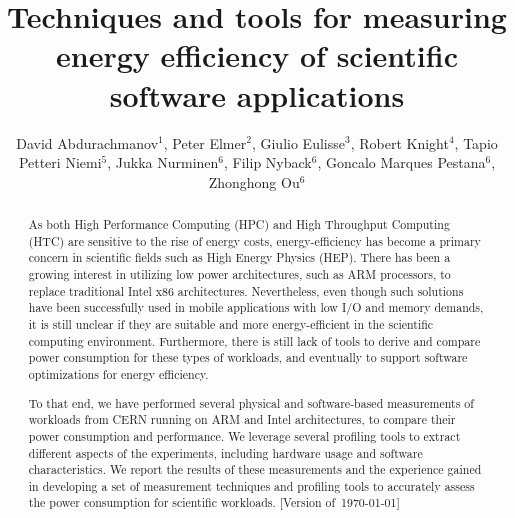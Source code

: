 \documentclass[a4paper]{jpconf}
\begin{document}

\title{Techniques and tools for measuring energy efficiency of scientific software applications}

\author{David Abdurachmanov$^1$, Peter Elmer$^2$, Giulio Eulisse$^3$, Robert Knight$^4$, Tapio Petteri Niemi$^5$, Jukka Nurminen$^6$, Filip Nyback$^6$, Goncalo Marques Pestana$^6$, Zhonghong Ou$^6$}

\address{$^1$ Digital Science and Computing Center, Faculty of Mathematics and Informatics, Vilnius University, Vilnius, Lithuania}
\address{$^2$ Department of Physics, Princeton University, Princeton, NJ 08540, USA}
\address{$^3$ Fermilab, Batavia, IL 60510, USA}
\address{$^4$ Research Computing, Office of Information Technology, Princeton University, Princeton, New Jersey 08540, USA}
\address{$^5$ Helsinki Institute of Physics, PO Box 64, FI-00014, Helsinki, Finland }
\address{$^6$ Aalto University, PO Box 11100, 00076 Aalto, Finland}


\begin{abstract}
As both High Performance Computing (HPC) and High Throughput Computing
(HTC) are sensitive to the rise of energy costs, energy-efficiency
has become a primary concern in scientific fields such as High
Energy Physics (HEP). There has been a growing interest in utilizing
low power architectures, such as ARM processors, to replace traditional
Intel x86 architectures. Nevertheless, even though such solutions
have been successfully used in mobile applications with low I/O and
memory demands, it is still unclear if they are suitable and more
energy-efficient in the scientific computing environment. Furthermore,
there is still lack of tools to derive and compare power consumption
for these types of workloads, and eventually to support software
optimizations for energy efficiency.

To that end, we have performed several physical and software-based
measurements of workloads from CERN running on ARM and Intel
architectures, to compare their power consumption and performance.
We leverage several profiling tools to extract different aspects
of the experiments, including hardware usage and software
characteristics. We report the results of these measurements and
the experience gained in developing a set of measurement techniques
and profiling tools to accurately assess the power consumption for
scientific workloads. [Version of~\today]
\end{abstract}
\end{document}
